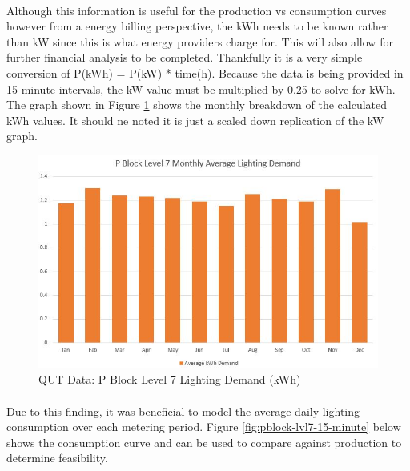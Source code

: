 \paragraph{}
Although this information is useful for the production vs consumption curves however from a energy billing perspective, the kWh needs to be known rather than kW since this is what energy providers charge for. This will also allow for further financial analysis to be completed. Thankfully it is a very simple conversion of P(kWh) = P(kW) * time(h). Because the data is being provided in 15 minute intervals, the kW value must be multiplied by 0.25 to solve for kWh. The graph shown in Figure \ref{fig:pblock-lvl7-monthly-kwh} shows the monthly breakdown of the calculated kWh values. It should ne noted it is just a scaled down replication of the kW graph.    

\begin{figure}[H]
	\hfill\includegraphics[width = 150mm]{images/metering/pme/pblock-lvl7-monthly-kwh}\hspace*{\fill}
	\caption{QUT Data: P Block Level 7 Lighting Demand (kWh)} 
	\label{fig:pblock-lvl7-monthly-kwh}
\end{figure} 

\paragraph{}
Due to this finding, it was beneficial to model the average daily lighting consumption over each metering period. Figure \ref{fig:pblock-lvl7-15-minute} below shows the consumption curve and can be used to compare against production to determine feasibility.  

